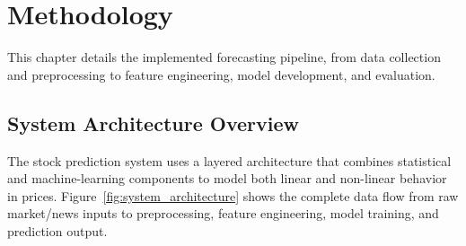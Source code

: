 \section{Methodology}

This chapter details the implemented forecasting pipeline, from data collection and preprocessing to feature engineering, model development, and evaluation.

\subsection{System Architecture Overview}

The stock prediction system uses a layered architecture that combines statistical and machine-learning components to model both linear and non-linear behavior in prices. Figure~\ref{fig:system_architecture} shows the complete data flow from raw market/news inputs to preprocessing, feature engineering, model training, and prediction output.

